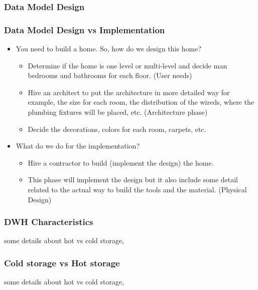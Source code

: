 \subsubsection{Data Model Design}
\begin{frame}
\frametitle{Data Model Design vs Implementation}
	\begin{itemize}[<+->]
	\item You need to build a home. So, how do we design this home?
		\begin{itemize}[<+->]
			\item Determine if the home is one level or multi-level and decide man bedrooms and bathrooms for each floor. (User needs)
			\item Hire an architect to put the architecture in more detailed way for example, the size for each room, the distribution of the wireds, where the plumbing fixtures will be placed, etc. (Architecture phase)
			\item Decide the decorations, colors for each room, carpets, etc. 
		\end{itemize}
	\item What do we do for the implementation?
		\begin{itemize}[<+->]
			\item Hire a contractor to build (implement the design) the home. 
			\item This phase will implement the design but it also include some detail related to the actual way to build the tools and the material. (Physical Design)
		\end{itemize}		
	\end{itemize}
\end{frame}

\begin{frame}
\frametitle{DWH Characteristics}



some details about hot vs cold storage,

\end{frame}

\begin{frame}

\frametitle{Cold storage vs Hot storage}

some details about hot vs cold storage,

\end{frame}

